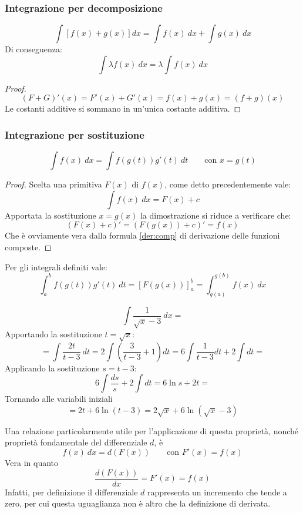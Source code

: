 \subsubsection{Integrazione per decomposizione}
\begin{prop}
	\[
		\int[f(x)+g(x)]dx = \int f(x)~dx+\int g(x)~dx
	\]
	Di conseguenza:
	\[
		\int \lambda f(x)~dx=\lambda\int f(x)~dx
	\]
\end{prop}
\begin{proof}
	\[
		(F+G)'(x)=F'(x)+G'(x)=f(x)+g(x)=(f+g)(x)
	\]
	Le costanti additive si sommano in un'unica costante additiva.
\end{proof}

\subsubsection{Integrazione per sostituzione}
\begin{prop}
	\label{prop:intsost}
	\[
		\int f(x)~dx=\int f(g(t))g'(t)~dt\qquad\text{con }x=g(t)
	\]
\end{prop}
\begin{proof}
	Scelta una primitiva $F(x)$ di $f(x)$, come detto precedentemente vale:
	\[
		\int f(x)~dx=F(x)+c
	\]
	Apportata la sostituzione $x=g(x)$ la dimostrazione si riduce a verificare che:
	\[
		(F(x)+c)'=(F(g(x))+c)'=f(x)
	\]
	Che è ovviamente vera dalla formula \ref{der:comp} di derivazione delle funzioni composte.
\end{proof}
Per gli integrali definiti vale:
\[
	\int_a^b f(g(t))g'(t)~dt=[F(g(x))]_a^b=\int_{g(a)}^{g(b)} f(x)~dx
\]

\begin{examp}
	\[
		\int \frac{1}{\sqrt{x}-3}~dx=
	\]
	Apportando la sostituzione $t=\sqrt{x}$:
	\[
		=\int\frac{2t}{t-3}~dt=2\int\left(\frac{3}{t-3}+1\right)dt=6\int\frac{1}{t-3}dt+2\int dt=
	\]
	Applicando la sostituzione $s=t-3$:
	\[
		6\int\frac{ds}{s}+2\int dt=6\ln s+2t=
	\]
	Tornando alle variabili iniziali
	\[
		=2t+6\ln(t-3)=2\sqrt{x}+6\ln(\sqrt{x}-3)
	\]
\end{examp}

Una relazione particolarmente utile per l'applicazione di questa proprietà, nonché proprietà fondamentale del differenziale $d$, è
\begin{equation}
	\label{differenziale}
	f(x)~dx=d(F(x))\qquad\text{con }F'(x)=f(x)
\end{equation}
Vera in quanto
\[
	\frac{d(F(x))}{dx}=F'(x)=f(x)
\]
Infatti, per definizione il differenziale $d$ rappresenta un incremento che tende a zero, per cui questa uguaglianza non è altro che la definizione di derivata.

